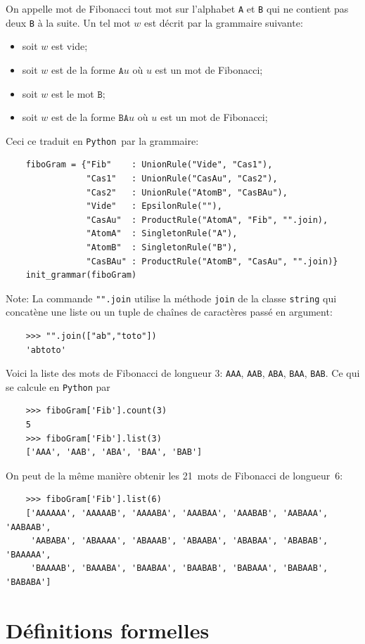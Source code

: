 \documentclass[11pt]{article}
\newcommand{\Python}{\texttt{Python}}
\begin{document}
On appelle mot de Fibonacci tout mot sur l'alphabet \texttt{A} et \texttt{B}
qui ne contient pas deux \texttt{B} à la suite. Un tel mot $w$ est décrit par
la grammaire suivante:
\begin{itemize}
\item soit $w$ est vide;
\item soit $w$ est de la forme $\texttt{A} u$ où $u$ est un mot de Fibonacci;
\item soit $w$ est le mot $\texttt{B}$;
\item soit $w$ est de la forme $\texttt{B} \texttt{A} u$ où $u$ est un mot de Fibonacci;
\end{itemize}
Ceci ce traduit en \Python\ par la grammaire:
\begin{verbatim}
    fiboGram = {"Fib"    : UnionRule("Vide", "Cas1"),
                "Cas1"   : UnionRule("CasAu", "Cas2"),
                "Cas2"   : UnionRule("AtomB", "CasBAu"),
                "Vide"   : EpsilonRule(""),
                "CasAu"  : ProductRule("AtomA", "Fib", "".join),
                "AtomA"  : SingletonRule("A"),
                "AtomB"  : SingletonRule("B"),
                "CasBAu" : ProductRule("AtomB", "CasAu", "".join)}
    init_grammar(fiboGram)
\end{verbatim}
Note: La commande \verb+"".join+ utilise la méthode \texttt{join} de la classe
\texttt{string} qui concatène une liste ou un tuple de chaînes de caractères
passé en argument:
\begin{verbatim}
    >>> "".join(["ab","toto"])
    'abtoto'
\end{verbatim}
Voici la liste des mots de Fibonacci de longueur 3: \texttt{AAA},
\texttt{AAB}, \texttt{ABA}, \texttt{BAA}, \texttt{BAB}.  Ce qui se calcule en
\Python{} par
\begin{verbatim}
    >>> fiboGram['Fib'].count(3)
    5
    >>> fiboGram['Fib'].list(3)
    ['AAA', 'AAB', 'ABA', 'BAA', 'BAB']
\end{verbatim}
On peut de la même manière obtenir les 21~mots de Fibonacci de longueur~6:
\begin{verbatim}
    >>> fiboGram['Fib'].list(6)
    ['AAAAAA', 'AAAAAB', 'AAAABA', 'AAABAA', 'AAABAB', 'AABAAA', 'AABAAB', 
     'AABABA', 'ABAAAA', 'ABAAAB', 'ABAABA', 'ABABAA', 'ABABAB', 'BAAAAA', 
     'BAAAAB', 'BAAABA', 'BAABAA', 'BAABAB', 'BABAAA', 'BABAAB', 'BABABA']
\end{verbatim}




\section{Définitions formelles}
\end{document}
